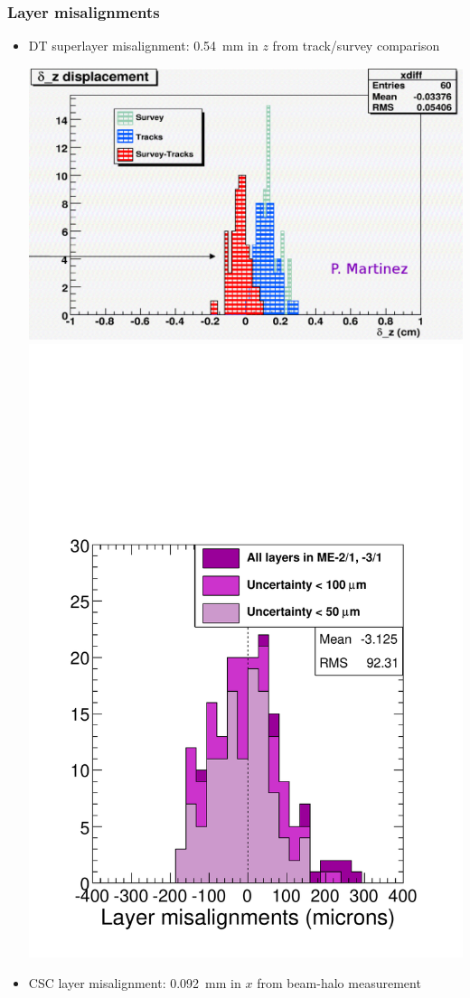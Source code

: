 \documentclass[compress]{beamer}
\begin{document}
\begin{frame}
\frametitle{Layer misalignments}

\begin{itemize}
\item DT superlayer misalignment: 0.54~mm in $z$ from track/survey comparison

\includegraphics[width=0.6\linewidth]{internal_alignment.png}\includegraphics[width=0.4\linewidth]{layer_hist.pdf}

\item CSC layer misalignment: 0.092~mm in $x$ from beam-halo measurement
\end{itemize}
\end{frame}



\end{document}

